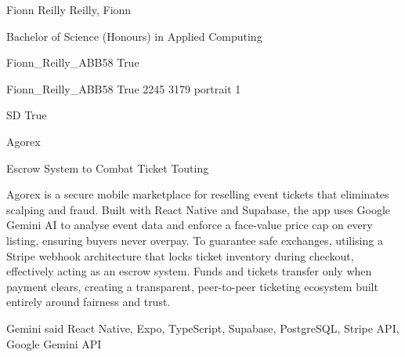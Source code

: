 \documentclass[twoside]{report}
\begin{document}
\begingroup{}\relax



\def\Key{Fionn_Reilly_ABB58}

{Fionn Reilly}
{Reilly, Fionn}

{Bachelor of Science (Honours) in Applied Computing}

{Fionn_Reilly_ABB58}
{True}

{Fionn_Reilly_ABB58}
{True}
{2245}
{3179}
{portrait}
{1}

{SD}
{True}

{Agorex}

{Escrow System to Combat Ticket Touting}

{Agorex is a secure mobile marketplace for reselling event tickets that eliminates scalping and fraud. Built with React Native and Supabase, the app uses Google Gemini AI to analyse event data and enforce a face-value price cap on every listing, ensuring buyers never overpay. To guarantee safe exchanges, utilising a Stripe webhook architecture that locks ticket inventory during checkout, effectively acting as an escrow system. Funds and tickets transfer only when payment clears, creating a transparent, peer-to-peer ticketing ecosystem built entirely around fairness and trust.}

{Gemini said React Native, Expo, TypeScript, Supabase, PostgreSQL, Stripe API, Google Gemini API}
\end{document}
